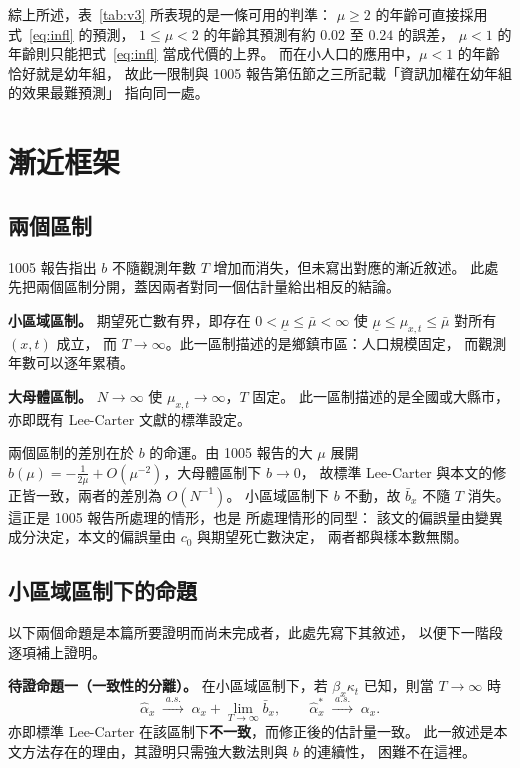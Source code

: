 \documentclass[UTF8, fontset=macnew, a4paper, 12pt]{ctexart}
\begin{document}
綜上所述，表~\ref{tab:v3} 所表現的是一條可用的判準：
$\mu\ge2$ 的年齡可直接採用式~\eqref{eq:infl} 的預測，
$1\le\mu<2$ 的年齡其預測有約 $0.02$ 至 $0.24$ 的誤差，
$\mu<1$ 的年齡則只能把式~\eqref{eq:infl} 當成代價的上界。
而在小人口的應用中，$\mu<1$ 的年齡恰好就是幼年組，
故此一限制與 1005 報告第伍節之三所記載「資訊加權在幼年組的效果最難預測」
指向同一處。

\section{漸近框架}\label{sec:asym}

\subsection{兩個區制}

1005 報告指出 $b$ 不隨觀測年數 $T$ 增加而消失，但未寫出對應的漸近敘述。
此處先把兩個區制分開，蓋因兩者對同一個估計量給出相反的結論。

\textbf{小區域區制。} 期望死亡數有界，即存在 $0<\underline\mu\le\bar\mu<\infty$
使 $\underline\mu\le\mu_{x,t}\le\bar\mu$ 對所有 $(x,t)$ 成立，
而 $T\to\infty$。此一區制描述的是鄉鎮市區：人口規模固定，
而觀測年數可以逐年累積。

\textbf{大母體區制。} $N\to\infty$ 使 $\mu_{x,t}\to\infty$，$T$ 固定。
此一區制描述的是全國或大縣市，亦即既有 Lee-Carter 文獻的標準設定。

兩個區制的差別在於 $b$ 的命運。由 1005 報告的大 $\mu$ 展開
$b(\mu)=-\frac{1}{2\mu}+O(\mu^{-2})$，大母體區制下 $b\to0$，
故標準 Lee-Carter 與本文的修正皆一致，兩者的差別為 $O(N^{-1})$。
小區域區制下 $b$ 不動，故 $\bar b_x$ 不隨 $T$ 消失。
這正是 1005 報告所處理的情形，也是 \citet{breslow1995} 所處理情形的同型：
該文的偏誤量由變異成分決定，本文的偏誤量由 $c_0$ 與期望死亡數決定，
兩者都與樣本數無關。

\subsection{小區域區制下的命題}

以下兩個命題是本篇所要證明而尚未完成者，此處先寫下其敘述，
以便下一階段逐項補上證明。

\textbf{待證命題一（一致性的分離）。}
在小區域區制下，若 $\beta_x\kappa_t$ 已知，則當 $T\to\infty$ 時
\[
\hat\alpha_x\;\xrightarrow{\;a.s.\;}\;\alpha_x+\lim_{T\to\infty}\bar b_x,
\qquad
\hat\alpha^{\ast}_x\;\xrightarrow{\;a.s.\;}\;\alpha_x .
\]
亦即標準 Lee-Carter 在該區制下\textbf{不一致}，而修正後的估計量一致。
此一敘述是本文方法存在的理由，其證明只需強大數法則與 $b$ 的連續性，
困難不在這裡。
\end{document}
